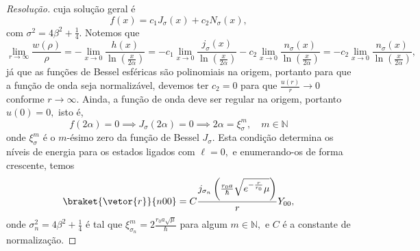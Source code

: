\begin{proof}[Resolução]
    cuja solução geral é
    \begin{equation*}
        f(x) = c_1 J_{\sigma}(x) + c_2 N_{\sigma}(x),
    \end{equation*}
    com \(\sigma^2 = 4\beta^2 + \frac14.\) Notemos que
    \begin{equation*}
        \lim_{r\to\infty}{\frac{w(\rho)}{\rho}} = -\lim_{x \to 0}{\frac{h(x)}{\ln\left(\frac{x}{2\alpha}\right)}} = 
        -c_1 \lim_{x\to0}{\frac{j_\sigma(x)}{\ln\left(\frac{x}{2\alpha}\right)}} - c_2 \lim_{x\to0}{\frac{n_\sigma(x)}{\ln\left(\frac{x}{2\alpha}\right)}}
        = -c_2\lim_{x\to0}{\frac{n_\sigma(x)}{\ln\left(\frac{x}{2\alpha}\right)}},
    \end{equation*}
    já que as funções de Bessel esféricas são polinomiais na origem, portanto para que a função de onda seja normalizável, devemos ter \(c_2 = 0\) para que \(\frac{u(r)}{r} \to 0\) conforme \(r \to \infty.\) Ainda, a função de onda deve ser regular na origem, portanto \(u(0) = 0,\) isto é,
    \begin{equation*}
        f(2\alpha) = 0 \implies J_\sigma(2 \alpha) = 0 \implies 2\alpha = \xi^m_\sigma, \quad m \in \mathbb{N}
    \end{equation*}
    onde \(\xi^m_{\sigma}\) é o \(m\)-ésimo zero da função de Bessel \(J_\sigma\). Esta condição determina os níveis de energia para os estados ligados com \(\ell = 0,\) e enumerando-os de forma crescente, temos
    \begin{equation*}
        \braket{\vetor{r}}{n00} = C\frac{j_{\sigma_n}\left(\frac{r_0 a}{\hbar}\sqrt{e^{-\frac{r}{r_0}}\mu}\right)}{r}Y_{00},
    \end{equation*}
    onde \(\sigma_n^2 = 4\beta^2 + \frac14\) é tal que \(\xi^m_{\sigma_n} = 2\frac{r_0 a \sqrt{\mu}}{\hbar}\) para algum \(m \in \mathbb{N},\) e \(C\) é a constante de normalização.
\end{proof}
